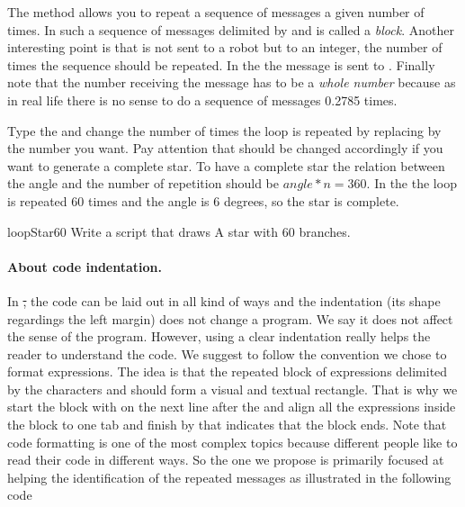 

The method \timesRepeat allows you to repeat a sequence of messages a given number of times. In \sq such a sequence of messages delimited by \ct{[} and \ct{]} is called a \emph{block}. Another interesting point is that \timesRepeat is not sent to a robot but to an integer, the number of times the sequence should be repeated. In the
 the message \timesRepeat \ct{[...]} is sent
to . Finally note that the number receiving the message \timesRepeat has to be  a \emph{whole number}  because as in real life there is no sense to do a sequence of 
messages 0.2785 times.



Type the  and change the number of
times the loop is repeated by replacing  by the number you want.
Pay attention that  should be changed accordingly if you want
to generate a complete star. To have a complete star the relation
between the angle and the number of repetition should be $angle * n =
360$. In the  the loop is repeated 60 times and the angle is 6 degrees, so the star is complete. 

\begin{exofig}{loopStar60}\label{scr:starsixty}
Write a script that draws A star with 60 branches.
\end{exofig}


\paragraph{About code indentation.}
In \st, the code can be laid out in all kind of ways and the indentation (its shape regardings the left margin) does not change a program. We say it does not affect the sense of the program. However, using a clear indentation really helps the reader to understand the code. We suggest to follow the convention we chose to format  expressions. The idea is that the repeated block of expressions delimited by the characters \ct{[} and \ct{]} should form a visual and textual rectangle. That is why we start the block with \ct{[} on the next line after the  and align all the expressions inside the block to one tab and finish by \ct{]} that indicates that the block ends. Note that code formatting is one of the most complex topics because different people like to read their code in different ways. So the one we propose is primarily focused at helping the identification of the repeated messages as illustrated in the following code

